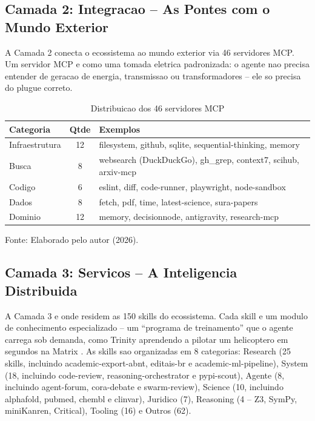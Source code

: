 \documentclass[12pt,a4paper,oneside,sumario=tradicional,chapter=TITLE,section=TITLE,subsection=TITLE,english,brazil]{abntex2}
\begin{document}
\subsection{Camada 2: Integracao -- As Pontes com o Mundo Exterior}

A Camada 2 conecta o ecossistema ao mundo exterior via 46 servidores MCP. Um servidor MCP e como uma tomada eletrica padronizada: o agente nao precisa entender de geracao de energia, transmissao ou transformadores -- ele so precisa do plugue correto.

\begin{table}[H]\centering\caption{Distribuicao dos 46 servidores MCP}\label{tab:mcp}
\begin{tabular}{lcl}\toprule\textbf{Categoria} & \textbf{Qtde} & \textbf{Exemplos} \\\midrule
Infraestrutura & 12 & filesystem, github, sqlite, sequential-thinking, memory \\
Busca & 8 & websearch (DuckDuckGo), gh\_grep, context7, scihub, arxiv-mcp \\
Codigo & 6 & eslint, diff, code-runner, playwright, node-sandbox \\
Dados & 8 & fetch, pdf, time, latest-science, sura-papers \\
Dominio & 12 & memory, decisionnode, antigravity, research-mcp \\\bottomrule
\end{tabular}
\small\vspace{2pt}Fonte: Elaborado pelo autor (2026).\smallskip
\end{table}

\subsection{Camada 3: Servicos -- A Inteligencia Distribuida}

A Camada 3 e onde residem as 150 skills do ecossistema. Cada skill e um modulo de conhecimento especializado -- um ``programa de treinamento'' que o agente carrega sob demanda, como Trinity aprendendo a pilotar um helicoptero em segundos na Matrix \cite{macedo2026engenharia}. As skills sao organizadas em 8 categorias: Research (25 skills, incluindo academic-export-abnt, editais-br e academic-ml-pipeline), System (18, incluindo code-review, reasoning-orchestrator e pypi-scout), Agente (8, incluindo agent-forum, cora-debate e swarm-review), Science (10, incluindo alphafold, pubmed, chembl e clinvar), Juridico (7), Reasoning (4 -- Z3, SymPy, miniKanren, Critical), Tooling (16) e Outros (62).
\end{document}
